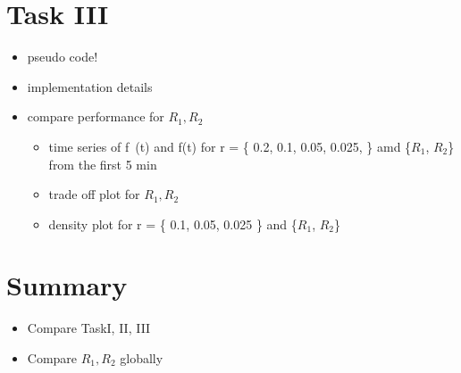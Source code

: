 \documentclass[a4paper, smallheadings,english]{scrartcl}
\begin{document}
\section{Task III}
\begin{itemize}
    \item pseudo code!
    \item implementation details
    \item compare performance for $R_1, R_2$
    \begin{itemize}
        \item time series of f~(t) and f(t) for r = \{ 0.2, 0.1, 0.05, 0.025, \} amd \{$R_1$, $R_2$\} from the first 5 min
        \item trade off plot for $R_1, R_2$
        \item density plot for r = \{ 0.1, 0.05, 0.025 \} and \{$R_1$, $R_2$\}
    \end{itemize}
\end{itemize}

\section{Summary}
\begin{itemize}
    \item Compare TaskI, II, III
    \item Compare $R_1, R_2$ globally
\end{itemize}


\end{document}
